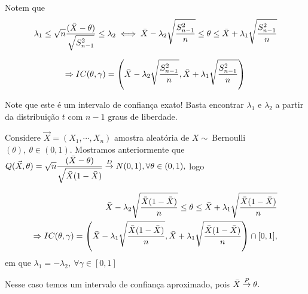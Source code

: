 \documentclass[12pt]{beamer}
\begin{document}
\begin{frame}{}
\begin{block}{}
\justifying
Notem que
\begin{align*}
    \lambda_{1}\leq \sqrt{n}\dfrac{(\Bar{X}-\theta)}{\sqrt{S_{n-1}^{2}}}\leq \lambda_{2}\iff
    \Bar{X}-\lambda_{2}\sqrt{\frac{S_{n-1}^{2}}{n}}\leq \theta \leq \Bar{X}+\lambda_{1}\sqrt{\frac{S_{n-1}^{2}}{n}}
\end{align*}
\end{block}
\pause
\begin{block}{}
\justifying
$$\Rightarrow IC(\theta,\gamma)=\left(\Bar{X}-\lambda_{2}\sqrt{\frac{S_{n-1}^{2}}{n}},\Bar{X}+\lambda_{1}\sqrt{\frac{S_{n-1}^{2}}{n}}\right)$$
\end{block}
\pause
\begin{block}{}
\justifying
Note que este é um intervalo de confiança exato! Basta encontrar $\lambda_{1}$ e $\lambda_{2}$ a partir da distribuição $t$ com $n-1$ graus de liberdade.
\end{block}
\end{frame}

\begin{frame}{}

\begin{block}{}
\justifying
Considere \(\Vec{X}=(X_{1},\cdots,X_{n})\) amostra aleatória de $X\sim~$Bernoulli$(\theta),~\theta\in(0,1).$ Mostramos anteriormente que $Q(\Vec{X},\theta)=\sqrt{n}\dfrac{(\Bar{X}-\theta)}{\sqrt{\Bar{X}(1-\Bar{X})}}\overset{D}{\rightarrow} N(0,1), \forall \theta \in (0,1),$ logo 
\end{block}
\pause
\begin{block}{}
\justifying
\begin{align*}
    \Bar{X}-\lambda_{2}\sqrt{\dfrac{\Bar{X}(1-\Bar{X})}{n}}\leq \theta \leq \Bar{X}+\lambda_{1}\sqrt{\dfrac{\Bar{X}(1-\Bar{X})}{n}}\\
    \Rightarrow IC(\theta,\gamma)=\left(\Bar{X}-\lambda_{1}\sqrt{\dfrac{\Bar{X}(1-\Bar{X})}{n}},\Bar{X}+\lambda_{1}\sqrt{\dfrac{\Bar{X}(1-\Bar{X})}{n}}\right)\cap[0,1],
\end{align*}
em que $\lambda_{1}=-\lambda_{2},~\forall\gamma\in[0,1]$
\end{block}
\pause
\begin{block}{}
\justifying
Nesse caso temos um intervalo de confiança aproximado, pois $\Bar{X}\overset{P}{\rightarrow} \theta.$
\end{block}
\end{frame}
\end{document}
